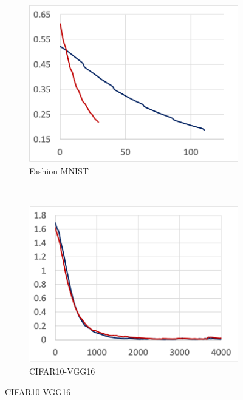 \begin{figure}[!ht]
\begin{subfigure}[t]{.24\textwidth}
    \includegraphics[width=\textwidth]{tf2-05}
    \caption{Fashion-MNIST}
  \end{subfigure}
  ~
  \begin{subfigure}[t]{.24\textwidth}
    \includegraphics[width=\textwidth]{tf2-06}
    \caption{CIFAR10-VGG16}
  \end{subfigure}


\end{figure}
